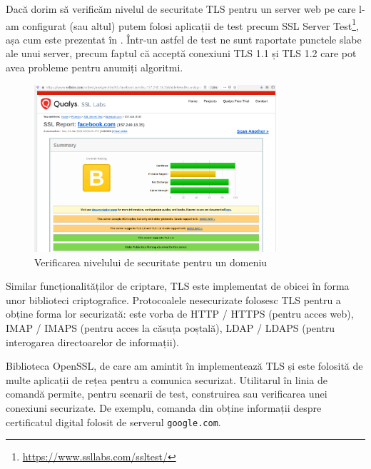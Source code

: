 Dacă dorim să verificăm nivelul de securitate TLS pentru un server web pe care l-am configurat (sau altul) putem folosi aplicații de test precum SSL Server Test\footnote{\url{https://www.ssllabs.com/ssltest/}}, așa cum este prezentat în .
Într-un astfel de test ne sunt raportate punctele slabe ale unui server, precum faptul că acceptă conexiuni TLS 1.1 și TLS 1.2 care pot avea probleme pentru anumiți algoritmi.

\begin{figure}[!htbp]
  \centering
  \includegraphics[width=0.8\textwidth]{chapters/12-sec/img/ssllabs.png}
  \caption{Verificarea nivelului de securitate pentru un domeniu}
  \label{fig:sec:ssllabs}
\end{figure}

Similar funcționalităților de criptare, TLS este implementat de obicei în forma unor biblioteci criptografice.
Protocoalele nesecurizate folosesc TLS pentru a obține forma lor securizată: este vorba de HTTP / HTTPS (pentru acces web), IMAP / IMAPS (pentru acces la căsuța poștală), LDAP / LDAPS (pentru interogarea directoarelor de informații).

Biblioteca OpenSSL, de care am amintit în  implementează TLS și este folosită de multe aplicații de rețea pentru a comunica securizat.
Utilitarul în linia de comandă  permite, pentru scenarii de test, construirea sau verificarea unei conexiuni securizate.
De exemplu, comanda din  obține informații despre certificatul digital folosit de serverul \texttt{google.com}.


